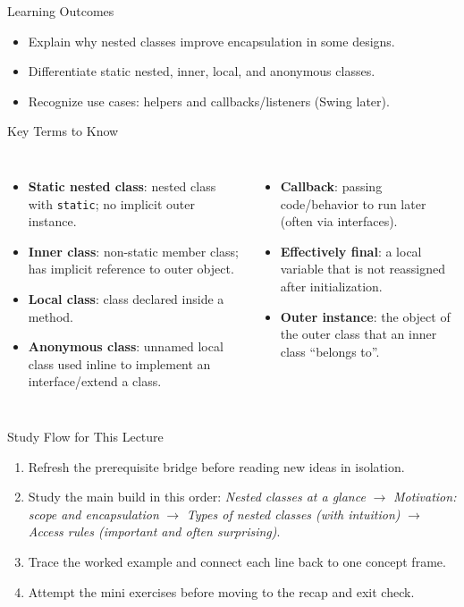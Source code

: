 \documentclass{beamer}
\begin{document}
\begin{frame}{Learning Outcomes}
  \begin{itemize}[<+->]
    \item Explain why nested classes improve encapsulation in some designs.
    \item Differentiate static nested, inner, local, and anonymous classes.
    \item Recognize use cases: helpers and callbacks/listeners (Swing later).
  \end{itemize}
  \slidesources{\OOPSUnitIIISources}
\end{frame}

\begin{frame}{Key Terms to Know}
\small
\begin{columns}[t]
\begin{itemize}
  \item \textbf{Static nested class}: nested class with \texttt{static}; no implicit outer instance.
  \item \textbf{Inner class}: non-static member class; has implicit reference to outer object.
  \item \textbf{Local class}: class declared inside a method.
  \item \textbf{Anonymous class}: unnamed local class used inline to implement an interface/extend a class.
\end{itemize}
\begin{itemize}
  \item \textbf{Callback}: passing code/behavior to run later (often via interfaces).
  \item \textbf{Effectively final}: a local variable that is not reassigned after initialization.
  \item \textbf{Outer instance}: the object of the outer class that an inner class ``belongs to''.
\end{itemize}
\end{columns}
  \slidesources{\OOPSUnitIIISources}
\end{frame}

\begin{frame}{Study Flow for This Lecture}
\begin{enumerate}[<+->]
  \item Refresh the prerequisite bridge before reading new ideas in isolation.
  \item Study the main build in this order: \textit{Nested classes at a glance} $\rightarrow$ \textit{Motivation: scope and encapsulation} $\rightarrow$ \textit{Types of nested classes (with intuition)} $\rightarrow$ \textit{Access rules (important and often surprising)}.
  \item Trace the worked example and connect each line back to one concept frame.
  \item Attempt the mini exercises before moving to the recap and exit check.
\end{enumerate}
  \slidesources{\OOPSUnitIIISources}
\end{frame}
\end{document}
